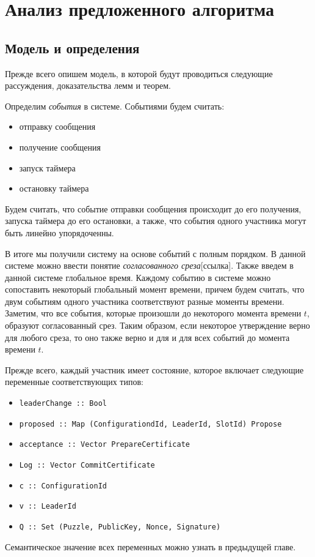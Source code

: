 
\chapter{Анализ предложенного алгоритма}  \label{chapter3}

\section{Модель и определения}
Прежде всего опишем модель, в которой будут проводиться следующие рассуждения, доказательства лемм и теорем.

Определим \textit{события} в системе. Событиями будем считать:
\begin{itemize}
\item отправку сообщения
\item получение сообщения
\item запуск таймера
\item остановку таймера
\end{itemize}

Будем считать, что событие отправки сообщения происходит до его получения, запуска таймера до его остановки, а также, что события одного участника могут быть линейно упорядоченны.

В итоге мы получили систему на основе событий с полным порядком. В данной системе можно ввести понятие \textit{согласованного среза}[ссылка]. Также введем в данной системе глобальное время. Каждому событию в системе можно сопоставить некоторый глобальный момент времени, причем будем считать, что двум событиям одного участника соответствуют разные моменты времени. Заметим, что все события, которые произошли до некоторого момента времени $t$, образуют согласованный срез. Таким образом, если некоторое утверждение верно для любого среза, то оно также верно и для и для всех событий до момента времени $t$.

Прежде всего, каждый участник имеет состояние, которое включает следующие переменные соответствующих типов:
\begin{itemize}
\item \texttt{leaderChange :: Bool}
\item \texttt{proposed :: Map (ConfigurationdId, LeaderId, SlotId) Propose}
\item \texttt{acceptance :: Vector PrepareCertificate}
\item \texttt{Log      :: Vector CommitCertificate}
\item \texttt{c          :: ConfigurationId}
\item \texttt{v          :: LeaderId}
\item \texttt{Q         :: Set (Puzzle, PublicKey, Nonce, Signature)}
\end{itemize}
Семантическое значение всех переменных можно узнать в предыдущей главе.

